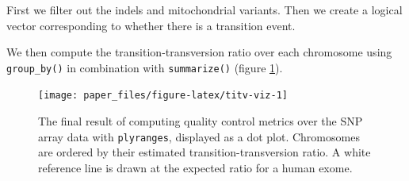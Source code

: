 \documentclass[]{article}
\newenvironment{Shaded}{\begin{snugshade}}{\end{snugshade}}
\newcommand{\DataTypeTok}[1]{\textcolor[rgb]{0.13,0.29,0.53}{#1}}
\newcommand{\KeywordTok}[1]{\textcolor[rgb]{0.13,0.29,0.53}{\textbf{#1}}}
\newcommand{\NormalTok}[1]{#1}
\newcommand{\OperatorTok}[1]{\textcolor[rgb]{0.81,0.36,0.00}{\textbf{#1}}}
\newcommand{\StringTok}[1]{\textcolor[rgb]{0.31,0.60,0.02}{#1}}
\begin{document}
First we filter out the indels and mitochondrial variants. Then we
create a logical vector corresponding to whether there is a transition
event.

\begin{Shaded}
\end{Shaded}

We then compute the transition-transversion ratio over each chromosome
using \texttt{group\_by()} in combination with \texttt{summarize()}
(figure \ref{fig:titv-viz}).

\begin{Shaded}
\end{Shaded}

\begin{figure}

{\centering \texttt{[image: paper\_files/figure-latex/titv-viz-1]} 

}

\caption{The final result of computing quality control metrics over the SNP array data with \texttt{plyranges}, displayed as a dot plot. Chromosomes are ordered by their estimated transition-transversion ratio. A white reference line is drawn at the expected ratio for a human exome.}\label{fig:titv-viz}
\end{figure}
\end{document}
